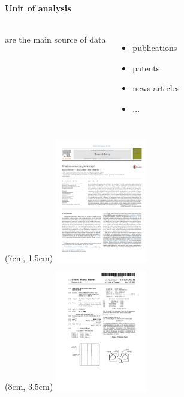 \documentclass[8pt]{beamer}
\begin{document}

\begin{frame}
\frametitle{\insertsection}
\framesubtitle{Unit of analysis}

\begin{columns}[c]

{\color{blue}{Documents}} are the main source of data
\begin{itemize}
\item publications
\item patents
\item news articles
\item ...
\end{itemize}

\end{columns}

\begin{textblock*}{8cm}(7cm, 1.5cm)
\colorbox{white}{\includegraphics[width=4cm, frame]{paper}}
\end{textblock*}

\begin{textblock*}{8cm}(8cm, 3.5cm)
\colorbox{white}{\includegraphics[width=4cm, frame]{patent}}
\end{textblock*}

\end{frame}

\end{document}
